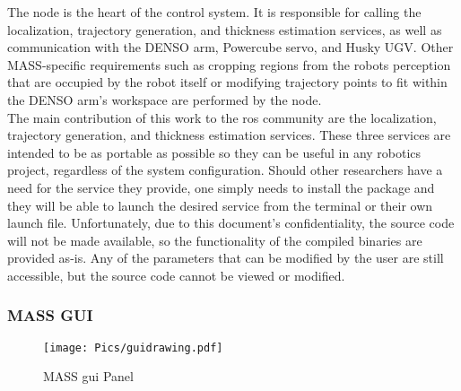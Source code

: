 The  node is the heart of the control system. It is responsible for calling the localization, trajectory generation, and thickness estimation services, as well as communication with the DENSO arm, Powercube servo, and Husky UGV. Other MASS-specific requirements such as cropping regions from the robots perception that are occupied by the robot itself or  modifying trajectory points to fit within the DENSO arm's workspace are performed by the  node. \\

The main contribution of this work to the \acrshort{ros} community are the localization, trajectory generation, and thickness estimation services. These three services are intended to be as portable as possible so they can be useful in any robotics project, regardless of the system configuration. Should other researchers have a need for the service they provide, one simply needs to install the package and they will be able to launch the desired service from the terminal or their own launch file. Unfortunately, due to this document's confidentiality, the source code will not be made available, so the functionality of the compiled binaries are provided as-is. Any of the parameters that can be modified by the user are still accessible, but the source code cannot be viewed or modified.\\

\subsubsection{MASS GUI}
\label{sub:gui}

\begin{figure}[ht!]
    \centering
    \texttt{[image: Pics/guidrawing.pdf]}
    \caption{MASS \acrshort{gui} Panel}
    \label{fig:thegui}
\end{figure}


